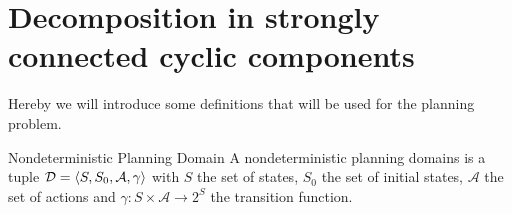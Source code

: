 %


\section{Decomposition in strongly connected cyclic components}

\newcommand{\planningdomain}{\ensuremath{ \tuple{\langle S, S_0, \mathcal{A}, \gamma \rangle} }}

\newcommand{\controller}{\ensuremath{\tuple{ \langle C, c_0, \Gamma, \Lambda, \delta, \Omega \rangle}}}

\newcommand{\planningproblem}{\ensuremath{\tuple{ \langle \mathcal{D}, G \rangle}}}

Hereby we will introduce some definitions that will be used for the planning problem.

\begin{nameddef}{Nondeterministic Planning Domain}
A nondeterministic planning domains is a tuple 
$\mathcal{D} = \planningdomain$
with
$S$ the set of states,
$S_0$ the set of initial states,
$\mathcal{A}$ the set of actions and
$\gamma : S \times \mathcal{A} \rightarrow 2^S$ the transition function.
\end{nameddef}


